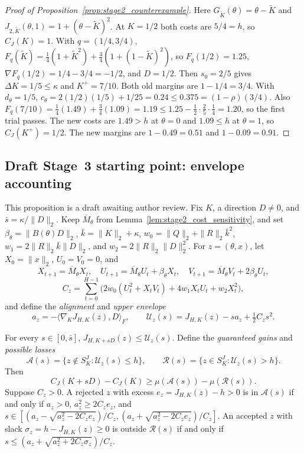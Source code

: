 \begin{proof}[Proof of Proposition~\ref{prop:stage2_counterexample}]
Here $G_{\widetilde K}(\theta)=\theta-\widetilde K$ and
$J_{2,\widetilde K}(\theta,1)=1+(\theta-\widetilde K)^2$. At $K=1/2$ both costs are
$5/4=h$, so $C_J(K)=1$. With $q=(1/4,3/4)$,
$F_q(\widetilde K)=\tfrac14(1+\widetilde K^2)+\tfrac34(1+(1-\widetilde K)^2)$, so
$F_q(1/2)=1.25$, $\nabla F_q(1/2)=1/4-3/4=-1/2$, and $D=1/2$. Then $s_0=2/5$ gives
$\Delta K=1/5\le\kappa$ and $K^+=7/10$. Both old margins are $1-1/4=3/4$. With
$d_\theta=1/5$, $c_\theta=2(1/2)(1/5)+1/25=0.24\le0.375=(1-\rho)(3/4)$.
Also $F_q(7/10)=\tfrac14(1.49)+\tfrac34(1.09)=1.19\le1.25-\tfrac12\cdot\tfrac25
\cdot\tfrac14=1.20$, so the first trial passes. The new costs are $1.49>h$ at
$\theta=0$ and $1.09\le h$ at $\theta=1$, so $C_J(K^+)=1/2$. The new margins are
$1-0.49=0.51$ and $1-0.09=0.91$.
\end{proof}

\subsection{Draft Stage~3 starting point: envelope accounting}
\label{subsec:stage3_envelope}

This proposition is a draft awaiting author review. Fix $K$, a direction $D\ne0$, and
$\bar s=\kappa/\|D\|_2$. Keep $\overline M_\theta$ from
Lemma~\ref{lem:stage2_cost_sensitivity}, and set $\beta_\theta=\|B(\theta)D\|_2$,
$\bar k=\|K\|_2+\kappa$, $w_0=\|Q\|_2+\|R\|_2\bar k^2$,
$w_1=2\|R\|_2\bar k\|D\|_2$, and $w_2=2\|R\|_2\|D\|_2^2$. For $z=(\theta,x)$, let
$X_0=\|x\|_2$, $U_0=V_0=0$, and
\[
 X_{t+1}=\overline M_\theta X_t,\quad
 U_{t+1}=\overline M_\theta U_t+\beta_\theta X_t,\quad
 V_{t+1}=\overline M_\theta V_t+2\beta_\theta U_t,
\]
\[
 C_z=\sum_{t=0}^{H-1}\big(2w_0(U_t^2+X_tV_t)+4w_1X_tU_t+w_2X_t^2\big),
\]
and define the \emph{alignment} and \emph{upper envelope}
\[
 a_z=-\langle\nabla_KJ_{H,K}(z),D\rangle_F,
 \qquad \mathcal U_z(s)=J_{H,K}(z)-sa_z+\tfrac12C_zs^2.
\]

\begin{proposition}
\label{prop:stage3_envelope}
For every $s\in[0,\bar s]$, $J_{H,K+sD}(z)\le\mathcal U_z(s)$. Define the
\emph{guaranteed gains} and \emph{possible losses}
\[
 \mathcal A(s)=\{z\notin S_K^J:\mathcal U_z(s)\le h\},
 \qquad
 \mathcal R(s)=\{z\in S_K^J:\mathcal U_z(s)>h\}.
\]
Then
\[
 C_J(K+sD)-C_J(K)\ge\mu(\mathcal A(s))-\mu(\mathcal R(s)).
\]
Suppose $C_z>0$. A rejected $z$ with excess $e_z=J_{H,K}(z)-h>0$ is in
$\mathcal A(s)$ if and only if $a_z>0$, $a_z^2\ge2C_ze_z$, and
$s\in[(a_z-\sqrt{a_z^2-2C_ze_z})/C_z,(a_z+\sqrt{a_z^2-2C_ze_z})/C_z]$. An accepted
$z$ with slack $\sigma_z=h-J_{H,K}(z)\ge0$ is outside $\mathcal R(s)$ if and only if
$s\le(a_z+\sqrt{a_z^2+2C_z\sigma_z})/C_z$.
\end{proposition}

